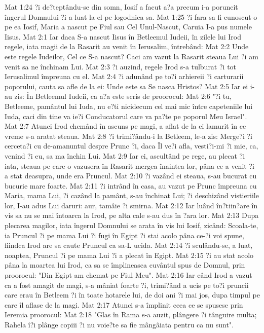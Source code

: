 Mat 1:24  ?i de?teptându-se din somn, Iosif a facut a?a precum i-a poruncit îngerul Domnului ?i a luat la el pe logodnica sa.
Mat 1:25  ?i fara sa fi cunoscut-o pe ea Iosif, Maria a nascut pe Fiul sau Cel Unul-Nascut, Caruia I-a pus numele Iisus.
Mat 2:1  Iar daca S-a nascut Iisus în Betleemul Iudeii, în zilele lui Irod regele, iata magii de la Rasarit au venit în Ierusalim, întrebând:
Mat 2:2  Unde este regele Iudeilor, Cel ce S-a nascut? Caci am vazut la Rasarit steaua Lui ?i am venit sa ne închinam Lui.
Mat 2:3  ?i auzind, regele Irod s-a tulburat ?i tot Ierusalimul împreuna cu el.
Mat 2:4  ?i adunând pe to?i arhiereii ?i carturarii poporului, cauta sa afle de la ei: Unde este sa Se nasca Hristos?
Mat 2:5  Iar ei i-au zis: În Betleemul Iudeii, ca a?a este scris de proorocul:
Mat 2:6  "?i tu, Betleeme, pamântul lui Iuda, nu e?ti nicidecum cel mai mic între capeteniile lui Iuda, caci din tine va ie?i Conducatorul care va pa?te pe poporul Meu Israel".
Mat 2:7  Atunci Irod chemând în ascuns pe magi, a aflat de la ei lamurit în ce vreme s-a aratat steaua.
Mat 2:8  ?i trimi?ându-i la Betleem, le-a zis: Merge?i ?i cerceta?i cu de-amanuntul despre Prunc ?i, daca Îl ve?i afla, vesti?i-mi ?i mie, ca, venind ?i eu, sa ma închin Lui.
Mat 2:9  Iar ei, ascultând pe rege, au plecat ?i iata, steaua pe care o vazusera în Rasarit mergea înaintea lor, pâna ce a venit ?i a stat deasupra, unde era Pruncul.
Mat 2:10  ?i vazând ei steaua, s-au bucurat cu bucurie mare foarte.
Mat 2:11  ?i intrând în casa, au vazut pe Prunc împreuna cu Maria, mama Lui, ?i cazând la pamânt, s-au închinat Lui; ?i deschizând vistieriile lor, I-au adus Lui daruri: aur, tamâie ?i smirna.
Mat 2:12  Iar luând în?tiin?are în vis sa nu se mai întoarca la Irod, pe alta cale s-au dus în ?ara lor.
Mat 2:13  Dupa plecarea magilor, iata îngerul Domnului se arata în vis lui Iosif, zicând: Scoala-te, ia Pruncul ?i pe mama Lui ?i fugi în Egipt ?i stai acolo pâna ce-?i voi spune, fiindca Irod are sa caute Pruncul ca sa-L ucida.
Mat 2:14  ?i sculându-se, a luat, noaptea, Pruncul ?i pe mama Lui ?i a plecat în Egipt.
Mat 2:15  ?i au stat acolo pâna la moartea lui Irod, ca sa se împlineasca cuvântul spus de Domnul, prin proorocul: "Din Egipt am chemat pe Fiul Meu".
Mat 2:16  Iar când Irod a vazut ca a fost amagit de magi, s-a mâniat foarte ?i, trimi?ând a ucis pe to?i pruncii care erau în Betleem ?i în toate hotarele lui, de doi ani ?i mai jos, dupa timpul pe care îl aflase de la magi.
Mat 2:17  Atunci s-a împlinit ceea ce se spusese prin Ieremia proorocul:
Mat 2:18  "Glas în Rama s-a auzit, plângere ?i tânguire multa; Rahela î?i plânge copiii ?i nu voie?te sa fie mângâiata pentru ca nu sunt".
